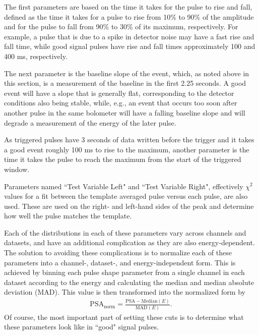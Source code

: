 \begin{description}[align=left]
\item [Rise and fall times] The first parameters are based on the time it takes for the pulse to rise and fall, defined as the time it takes for a pulse to rise from 10\% to 90\% of the amplitude and for the pulse to fall from 90\% to 30\% of its maximum, respectively.
For example, a pulse that is due to a spike in detector noise may have a fast rise and fall time, while good signal pulses have rise and fall times approximately 100 and 400 ms, respectively.
\item [Baseline slope] The next parameter is the baseline slope of the event, which, as noted above in this section, is a measurement of the baseline in the first 2.25 seconds.
A good event will have a slope that is generally flat, corresponding to the detector conditions also being stable, while, e.g., an event that occurs too soon after another pulse in the same bolometer will have a falling baseline slope and will degrade a measurement of the energy of the later pulse.
\item [Peak delay] As triggered pulses have 3 seconds of data written before the trigger and it takes a good event roughly 100 ms to rise to the maximum, another parameter is the time it takes the pulse to reach the maximum from the start of the triggered window.
\item [TVL and TVR] Parameters named ``Test Variable Left" and ``Test Variable Right", effectively $\chi^2$ values for a fit between the template averaged pulse versus each pulse, are also used.
These are used on the right- and left-hand sides of the peak and determine how well the pulse matches the template.
\end{description}
Each of the distributions in each of these parameters vary across channels and datasets, and have an additional complication as they are also energy-dependent.
The solution to avoiding these complications is to normalize each of these parameters into a channel-, dataset-, and energy-independent form.
This is achieved by binning each pulse shape parameter from a single channel in each dataset according to the energy and calculating the median and median absolute deviation (MAD).
This value is then transformed into the normalized form by
\begin{align}
    \textrm{PSA}_{\textrm{norm}} = \frac{\textrm{PSA} - \textrm{Median}(E)}{\textrm{MAD}(E)}.
\end{align}
Of course, the most important part of setting these cuts is to determine what these parameters look like in ``good" signal pulses.
